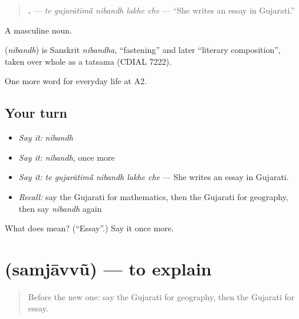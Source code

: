 \begin{quote}
\textbf{    .} — \emph{te gujarātīmā̃ nibandh lakhe che} — \textquotedblleft{}She writes an essay in Gujarati.\textquotedblright{}
\end{quote}

A masculine noun.

\begin{cousinweb}
\textbf{} (\emph{nibandh}) is Sanskrit \emph{nibandha}, \textquotedblleft{}fastening\textquotedblright{} and later \textquotedblleft{}literary composition\textquotedblright{}, taken over whole as a tatsama (CDIAL 7222).
\end{cousinweb}

\begin{grammarlens}[title={What you've built}]
One more word for everyday life at A2.
\end{grammarlens}

\subsection*{Your turn}
\begin{itemize}
\raggedright
  \item \emph{Say it:} \emph{nibandh}
  \item \emph{Say it:} \emph{nibandh}, once more
  \item \emph{Say it:} \emph{te gujarātīmā̃ nibandh lakhe che} — She writes an essay in Gujarati.
  \item \emph{Recall:} say the Gujarati for mathematics, then the Gujarati for geography, then say \emph{nibandh} again
\end{itemize}

\begin{tcolorbox}[breakable,colback=teal!4,colframe=teal!35!black,title={Before you move on}]
What does  mean? (\textquotedblleft{}Essay\textquotedblright{}.) Say it once more.
\end{tcolorbox}
\section[\texorpdfstring{\gu{સમજાવવું} (samjāvvũ)}{સમજાવવું (samjāvvũ)}]{ (samjāvvũ) — to explain}

\label{lesson:GU-C244-samjavvu}



\begin{quote}
Before the new one: say the Gujarati for geography, then the Gujarati for essay.
\end{quote}

